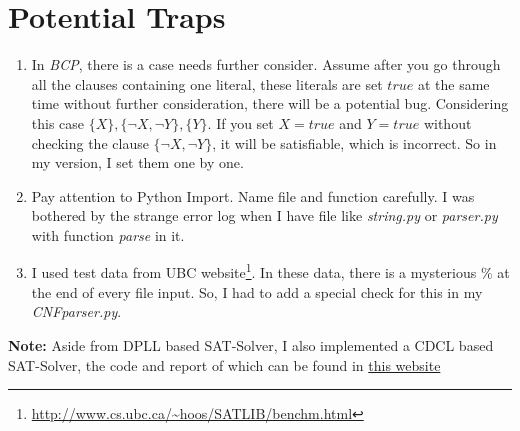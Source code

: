 \documentclass[a4paper,10pt]{article}
\begin{document}
\section{Potential Traps}
\begin{enumerate}
\setlength{\itemsep}{.1em}
\item In \textit{BCP}, there is a case needs further consider. Assume after you go through
    all the clauses containing one literal, these literals are set $true$ at
    the same time without further consideration, there will be a potential bug.
    Considering this case $\{X\},\{\neg X,\neg Y\},\{Y\}$. If you set $X=true$ and $Y=true$
    without checking the clause $\{\neg X,\neg Y\}$, it will be satisfiable, which is
    incorrect. So in my version, I set them one by one.
\item Pay attention to Python Import. Name file and function carefully.
    I was bothered by the strange error log
    when I have file like \textit{string.py} or \textit{parser.py}
    with function \textit{parse} in it.
\item I used test data from UBC 
    website\footnote{\url{http://www.cs.ubc.ca/~hoos/SATLIB/benchm.html}}.
    In these data, there is a mysterious \% at the end of every file input.
    So, I had to add a special check for this in my \textit{CNFparser.py}.
\end{enumerate}
\textbf{Note:} Aside from DPLL based SAT-Solver, I also implemented a CDCL based SAT-Solver, the code and report of which can be found in \url{this website}
\end{document}
